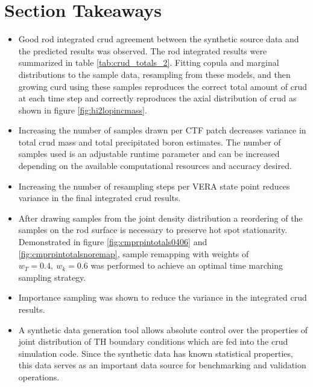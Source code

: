 \section{Section Takeaways}
\begin{itemize}
        \item  Good rod integrated crud agreement between the synthetic source data and the predicted results was observed.  The rod integrated results were summarized in table \ref{tab:crud_totals_2}.  Fitting copula and marginal distributions to the sample data, resampling from these models, and then growing curd using these samples reproduces the correct total amount of crud at each time step and correctly reproduces the axial distribution of crud as shown in figure \ref{fig:hi2lopincmass}.
        \item Increasing the number of samples drawn per CTF patch decreases variance in total crud mass and total precipitated boron estimates.  The number of samples used is an adjustable runtime parameter and can be increased depending on the available computational resources and accuracy desired.
        \item Increasing the number of resampling steps per VERA state point reduces variance in the final integrated crud results. 
        \item After drawing samples from the joint density distribution a reordering of the samples on the rod surface is necessary to preserve hot spot stationarity.  Demonstrated in figure \ref{fig:cmprpintotals0406} and \ref{fig:cmprpintotalsnoremap}, sample remapping with weights of $w_T=0.4,\ w_k=0.6$ was performed to achieve an optimal time marching sampling strategy.
        \item Importance sampling was shown to reduce the variance in the integrated crud results.
        \item A synthetic data generation tool allows absolute control over the properties of joint distribution of TH boundary conditions which are fed into the crud simulation code.  Since the synthetic data has known statistical properties, this data serves as an important data source for benchmarking and validation operations.
\end{itemize}
